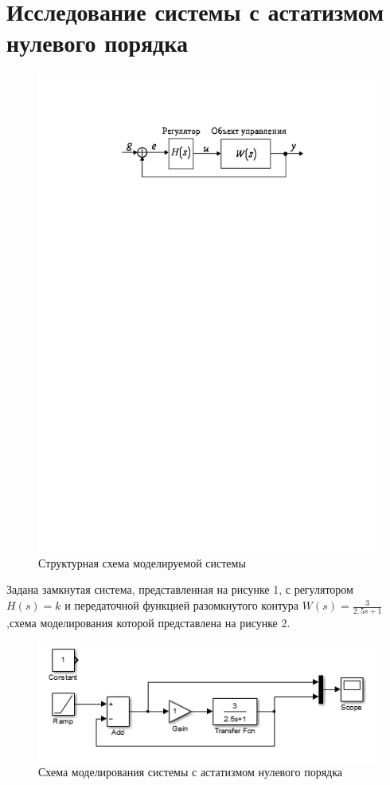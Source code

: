 \documentclass[a4paper, 11pt, russian]{article}
\begin{document}
    \section{Исследование системы с астатизмом нулевого порядка}
    \begin{figure}[h!]
        \centering
        \includegraphics{0ast}
        \caption{Структурная схема моделируемой системы}
    \end{figure}
    Задана замкнутая система, представленная на рисунке 1, с регулятором $H(s) = k$ и передаточной функцией разомкнутого контура $W(s)=\displaystyle{\frac{3}{2,5s + 1}}$,схема моделирования которой представлена на рисунке 2.
    
    \begin{figure}[h!]
        \centering
        \includegraphics{0astScheme.PNG}
        \caption{Схема моделирования системы с астатизмом нулевого порядка}
    \end{figure}
\end{document}

